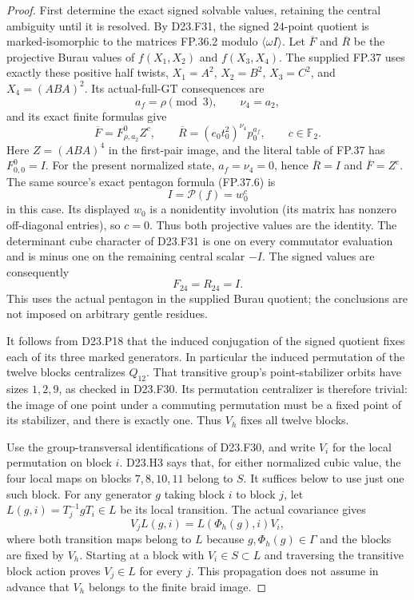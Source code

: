 \begin{proof}
First determine the exact signed solvable values, retaining
the central ambiguity until it is resolved. By D23.F31, the
signed $24$-point quotient is marked-isomorphic to the
matrices FP.36.2 modulo $\langle\omega I\rangle$.
Let $\overline F$ and $\overline R$ be the projective Burau
values of $f(X_1,X_2)$ and $f(X_3,X_4)$.
The supplied FP.37 uses exactly these positive half twists,
$X_1=A^2$, $X_2=B^2$, $X_3=C^2$, and
$X_4=(ABA)^2$. Its actual-full-GT consequences are
\[
 a_f=\rho\pmod3,\qquad \nu_4=a_2,
\]
and its exact finite formulas give
\[
 \overline F=F^0_{\rho,a_2}Z^c,
 \qquad
 \overline R=(e_0t_0^2)^{\nu_4}p_0^{a_f},
 \qquad c\in\mathbb F_2.
\]
Here $Z=(ABA)^4$ in the first-pair image, and the literal
table of FP.37 has $F^0_{0,0}=I$. For the present normalized
state, $a_f=\nu_4=0$, hence $\overline R=I$ and
$\overline F=Z^c$. The same source's exact pentagon formula
(FP.37.6) is
\[
                     I=\mathcal P(f)=w_0^c
\]
in this case. Its displayed $w_0$ is a nonidentity involution
(its matrix has nonzero off-diagonal entries), so $c=0$.
Thus both projective values are the identity. The determinant
cube character of D23.F31 is one on every commutator
evaluation and is minus one on the remaining central scalar
$-I$. The signed values are consequently
\[
                             F_{24}=R_{24}=I.
\]
This uses the actual pentagon in the supplied Burau quotient;
the conclusions are not imposed on arbitrary gentle residues.

It follows from D23.P18 that the induced conjugation of the
signed quotient fixes each of its three marked generators.
In particular the induced permutation of the twelve blocks
centralizes $Q_{12}$. That transitive group's point-stabilizer
orbits have sizes $1,2,9$, as checked in D23.F30. Its
permutation centralizer is therefore trivial: the image of
one point under a commuting permutation must be a fixed
point of its stabilizer, and there is exactly one. Thus
$V_h$ fixes all twelve blocks.

Use the group-transversal identifications of D23.F30, and
write $V_i$ for the local permutation on block $i$.
D23.H3 says that, for either normalized cubic value, the
four local maps on blocks $7,8,10,11$ belong to $S$.
It suffices below to use just one such block.
For any generator $g$ taking block $i$ to block $j$, let
$L(g,i)=T_j^{-1}gT_i\in L$ be its local transition.
The actual covariance gives
\[
            V_jL(g,i)=L(\Phi_h(g),i)V_i,
\]
where both transition maps belong to $L$ because
$g,\Phi_h(g)\in\Gamma$ and the blocks are fixed by $V_h$.
Starting at a block with $V_i\in S\subset L$ and traversing
the transitive block action proves $V_j\in L$ for every $j$.
This propagation does not assume in advance that $V_h$
belongs to the finite braid image.


\end{proof}
